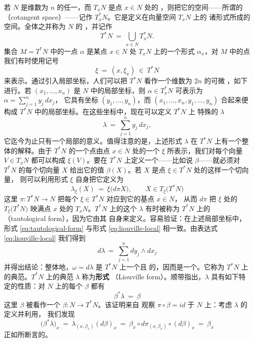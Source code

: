 若 $N$ 是维数为 $n$ 的任一\trManifold，而 $T_{x}N$ 是点 $x\in N$ 处的%
\trTangentSpace，则把它的\trDual{}空间——所谓的\textbf{\trCotangentSpace}%
（cotangent space）——记作 $T^{*}_{x}N$。它是定义在向量空间 $T_{x}N$ 上的%
诸\trLinear{}形式所成的空间。全体\trCotangentSpace{}之并称为 $N$ 的%
\trCotangentBundle，并记作
\[
T^{*}N\ =\ \bigcup_{x\in N}T^{*}_{x}N.
\]
集合 $M=T^{*}N$ 中的一点 $\alpha$ 是某点 $x\in N$ 处\trTangentSpace{} $T_{x}N$%
上的一个\trLinear{}形式 $\alpha_{x}$，对 $M$ 中的点我们有时使用记号
\[
\xi\ =\ (x,\xi_{x})\ \in\ T^{*}N
\]
来表示。通过引入局部坐标，人们可以把 $T^{*}N$ 看作一个维数为 $2n$ 的可微%
\trManifold，如下进行。若 $(x_{1},\dots,x_{n})$ 是 $N$ 中的局部坐标，则%
\trOneForm{} $\alpha\in T^{*}_{x}N$ 可表示为 $\alpha=\sum_{j=1}^{n}y_{j}\,dx_{j}$，%
它具有坐标 $(y_{1},\dots,y_{n})$，而 $(x_{1},\dots,x_{n},y_{1},\dots,y_{n})$%
合起来便构成 $T^{*}N$ 中的局部坐标。在这些坐标中，现在可以定义 $T^{*}N$ 上%
特殊的\trOneForm{} $\lambda$
\begin{equation}\label{eq:liouville-local}
\lambda\ =\ \sum_{j=1}^{n}y_{j}\,dx_{j},
\end{equation}
它迄今为止只有一个局部的意义。值得注意的是，上述形式 $\lambda$ 在 $T^{*}N$%
上有一个整体的解释。由于 $T^{*}N$ 的一个点由点 $x\in N$ 处的一个\trOneForm{}%
$\xi$ 所表示，我们对每个向量 $V\in T_{x}N$ 都可以构成 $\xi(V)$。要在 $T^{*}N$%
上定义一个\trOneForm{}——比如说 $\beta$——就必须对 $T^{*}N$ 的每个切向量%
$X$ 给出它的值 $\beta(X)$。若 $X$ 是点 $\xi\in T^{*}N$ 处的这样一个切向量，%
则可以利用形式 $\xi$ 自身把它定义为\trLinear{}\trFunctional
\begin{equation}\label{eq:tautological-form}
\lambda_{\xi}(X)\ =\ \xi\bigl(d\pi X\bigr),\qquad X\in T_{\xi}\bigl(T^{*}N\bigr)
\end{equation}
这里\trProjection{} $\pi:T^{*}N\to N$ 把每个 $\xi\in T^{*}N$ 对应到它的基点 $x\in N$，%
从而 $d\pi$ 把 $\xi$ 处的\trTangentSpace{} $T_{\xi}\bigl(T^{*}N\bigr)$ 映满点%
$x$ 处的\trTangentSpace{} $T_{x}N$。$T^{*}N$ 上的这个\trOneForm{} $\lambda$%
有时被称为 $T^{*}N$ 上的\textbf{\trTautologicalForm}（tautological form），因为它由其%
自身来定义。容易验证：在上述局部坐标中，形式 \eqref{eq:tautological-form}%
与形式 \eqref{eq:liouville-local} 相一致。由表达式 \eqref{eq:liouville-local}%
我们得到
\[
d\lambda\ =\ \sum_{j=1}^{n}dy_{j}\wedge dx_{j}
\]
并得出结论：整体地，$\omega=d\lambda$ 是 $T^{*}N$ 上一个\trClosed{}且%
\trNondegenerate{}的\trTwoForm，因而是一个\trSymplecticForm。它称为 $T^{*}N$%
上的典范\trSymplecticStructure。$T^{*}N$ 上的典范\trOneForm{} $\lambda$ 称为\textbf{\trLiouville{}形式}%
（Liouville form）。顺带指出，$\lambda$ 具有如下特定的性质：对 $N$ 上的每个%
\trOneForm{} $\beta$ 都有
\[
\beta^{*}\lambda\ =\ \beta
\]
这里\trOneForm{} $\beta$ 被看作一个\trSection{} $\beta:N\to T^{*}N$。该证明来自%
观察 $\pi\circ\beta=id$ 于 $N$ 上：考虑 $\lambda$ 的定义并利用\trChainRule，%
我们发现
\[
\bigl(\beta^{*}\lambda\bigr)_{x}\ =\ \lambda_{(x,\beta_{x})}(d\beta)_{x}\ =\ %
\beta_{x}\circ d\pi_{(x,\beta_{x})}\circ(d\beta)_{x}\ =\ \beta_{x}
\]
正如所断言的。

